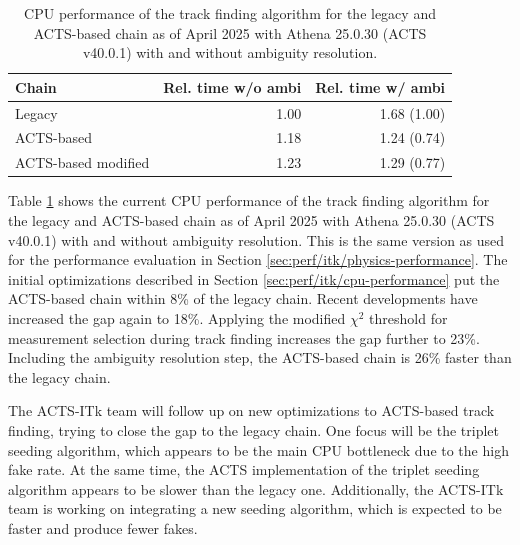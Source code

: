 \begin{table}[H]
    \centering
    \begin{tabular}{lrr}
        \hline
        \textbf{Chain} & \textbf{Rel. time w/o ambi} & \textbf{Rel. time w/ ambi} \\
        \hline
        Legacy & 1.00 & 1.68 (1.00) \\
        ACTS-based & 1.18 & 1.24 (0.74) \\
        ACTS-based modified & 1.23 & 1.29 (0.77) \\
        \hline
    \end{tabular}
    \caption{CPU performance of the track finding algorithm for the legacy and ACTS-based chain as of April 2025 with Athena 25.0.30 (ACTS v40.0.1) with and without ambiguity resolution.}
    \label{tab:perf/itk/track-finding-performance}
\end{table}

Table \ref{tab:perf/itk/track-finding-performance} shows the current CPU performance of the track finding algorithm for the legacy and ACTS-based chain as of April 2025 with Athena 25.0.30 (ACTS v40.0.1) with and without ambiguity resolution. This is the same version as used for the performance evaluation in Section \ref{sec:perf/itk/physics-performance}. The initial optimizations described in Section \ref{sec:perf/itk/cpu-performance} put the ACTS-based chain within 8\% of the legacy chain. Recent developments have increased the gap again to 18\%. Applying the modified $\chi^2$ threshold for measurement selection during track finding increases the gap further to 23\%. Including the ambiguity resolution step, the ACTS-based chain is 26\% faster than the legacy chain.

The ACTS-ITk team will follow up on new optimizations to ACTS-based track finding, trying to close the gap to the legacy chain. One focus will be the triplet seeding algorithm, which appears to be the main CPU bottleneck due to the high fake rate. At the same time, the ACTS implementation of the triplet seeding algorithm appears to be slower than the legacy one. Additionally, the ACTS-ITk team is working on integrating a new seeding algorithm, which is expected to be faster and produce fewer fakes.
